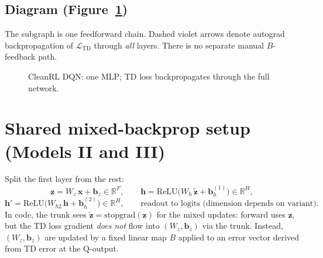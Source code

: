 \documentclass[11pt]{article}
\begin{document}
\subsection{Diagram (Figure~\ref{fig:dqn})}
The subgraph is one feedforward chain. \textcolor{violet!85!black}{Dashed violet} arrows denote autograd backpropagation of $\mathcal{L}_{\mathrm{TD}}$ through \emph{all} layers. There is no separate manual $B$-feedback path.

\begin{figure}[ht]
\centering
{}
\caption{CleanRL DQN: one MLP; TD loss backpropagates through the full network.}
\label{fig:dqn}
\end{figure}

\section{Shared mixed-backprop setup (Models II and III)}
\label{sec:mixed-shared}

Split the first layer from the rest:
\begin{equation}
\mathbf{z} = W_z\,\mathbf{x} + \mathbf{b}_z \in \mathbb{R}^{F},
\qquad
\mathbf{h} = \mathrm{ReLU}\!\bigl(W_h\,\tilde{\mathbf{z}} + \mathbf{b}_h^{(1)}\bigr) \in \mathbb{R}^{H},
\end{equation}
\begin{equation}
\mathbf{h}' = \mathrm{ReLU}\!\bigl(W_{h2}\,\mathbf{h} + \mathbf{b}_h^{(2)}\bigr) \in \mathbb{R}^{H},
\qquad
\text{readout to logits (dimension depends on variant).}
\end{equation}
In code, the trunk sees $\tilde{\mathbf{z}} = \mathrm{stopgrad}(\mathbf{z})$ for the mixed updates: forward uses $\mathbf{z}$, but the TD loss gradient \emph{does not} flow into $(W_z,\mathbf{b}_z)$ via the trunk. Instead, $(W_z,\mathbf{b}_z)$ are updated by a fixed linear map $B$ applied to an error vector derived from TD error at the Q-output.
\end{document}
